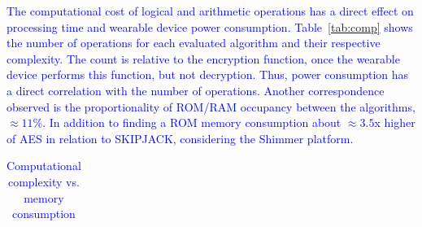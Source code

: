 \documentclass[journal]{IEEEtran}
\newcommand{\rever}{\textcolor{blue}}
\begin{document}
\rever{The computational cost of logical and arithmetic operations has a direct effect on processing time and wearable device power consumption. Table~\ref{tab:comp} shows the number of operations for each evaluated algorithm and their respective complexity. The count is relative to the encryption function, once the wearable device performs this function, but not decryption. Thus, power consumption has a direct correlation with the number of operations. Another correspondence observed is the proportionality of ROM/RAM occupancy between the algorithms, $\approx11$\%. In addition to finding a ROM memory consumption about $\approx3.5$x higher of AES in relation to SKIPJACK, considering the Shimmer platform.}

\begin{table}[h!]
\scriptsize
\centering
 \setlength\tabcolsep{7.7 pt} %
\vspace{-0.1cm}
\caption{\rever{Computational complexity vs. memory consumption}}
\vspace{-0.2cm}
\begin{tabular}{l|c|ccll}
\hline


\end{tabular}
\end{table}
\end{document}
